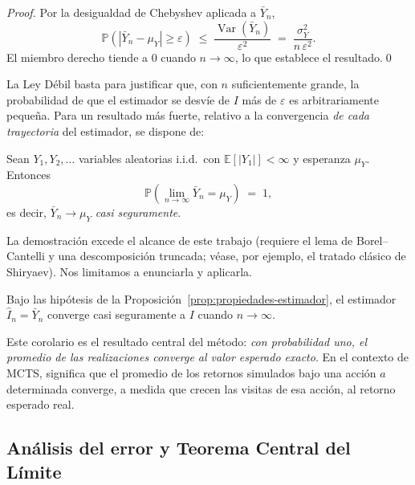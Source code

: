 \begin{proof}
Por la desigualdad de Chebyshev aplicada a $\bar{Y}_n$,
\[
    \mathbb{P}\!\left(\left|\bar{Y}_n - \mu_Y\right| \geq \varepsilon\right)
    \;\leq\; \frac{\operatorname{Var}(\bar{Y}_n)}{\varepsilon^2}
    \;=\; \frac{\sigma_Y^2}{n\,\varepsilon^2}.
\]
El miembro derecho tiende a $0$ cuando $n \to \infty$, lo que establece el resultado.\qed
\end{proof}

La Ley Débil basta para justificar que, con $n$ suficientemente grande, la probabilidad de que el estimador se desvíe de $I$ más de $\varepsilon$ es arbitrariamente pequeña. Para un resultado más fuerte, relativo a la convergencia \emph{de cada trayectoria} del estimador, se dispone de:

\begin{teorema}
\label{teorema:llng}
Sean $Y_1, Y_2, \ldots$ variables aleatorias i.i.d.\ con $\mathbb{E}[|Y_1|] < \infty$ y esperanza $\mu_Y$. Entonces
\[
    \mathbb{P}\!\left(\lim_{n \to \infty} \bar{Y}_n = \mu_Y\right) \;=\; 1,
\]
es decir, $\bar{Y}_n \to \mu_Y$ \emph{casi seguramente}.
\end{teorema}

La demostración excede el alcance de este trabajo (requiere el lema de Borel--Cantelli y una descomposición truncada; véase, por ejemplo, el tratado clásico de Shiryaev). Nos limitamos a enunciarla y aplicarla.

\begin{corolario}
\label{cor:convergencia-estimador}
Bajo las hipótesis de la Proposición~\ref{prop:propiedades-estimador}, el estimador $\widehat{I}_n = \bar{Y}_n$ converge casi seguramente a $I$ cuando $n \to \infty$.
\end{corolario}

Este corolario es el resultado central del método: \emph{con probabilidad uno, el promedio de las realizaciones converge al valor esperado exacto}. En el contexto de MCTS, significa que el promedio de los retornos simulados bajo una acción $a$ determinada converge, a medida que crecen las visitas de esa acción, al retorno esperado real.

\subsection{Análisis del error y Teorema Central del Límite}
\label{subsec:error-tcl}

